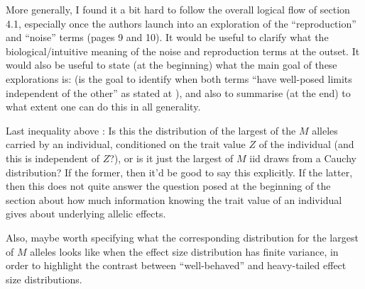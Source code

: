 \begin{point}{}
More generally, I found it a bit hard to follow the overall logical flow of section 4.1, especially once the authors launch into an exploration of the ``reproduction'' and ``noise'' terms (pages 9 and 10).
    It would be useful to clarify what the biological/intuitive meaning of the noise and reproduction terms at the outset. It would also be useful to state (at the beginning) what the main goal of these explorations is: (is the goal to identify when both terms ``have well-posed limits independent of the other'' as stated at ), and also to summarise (at the end) to what extent one can do this in all generality.
\end{point}



\begin{point}{}
    Last inequality above \revref: Is this the distribution of the largest of the $M$ alleles carried by an individual, conditioned on the trait value $Z$ of the individual (and this is independent of $Z$?), or is it just the largest of $M$ iid draws from a Cauchy distribution? If the former, then it'd be good to say this explicitly. If the latter, then this does not quite answer the question posed at the beginning of the section about how much information knowing the trait value of an individual gives about underlying allelic effects.
\end{point}


\begin{point}{}
Also, maybe worth specifying what the corresponding distribution for the largest of $M$ alleles looks like when the effect size distribution has finite variance, in order to highlight the contrast between ``well-behaved'' and heavy-tailed effect size distributions.
\end{point}

